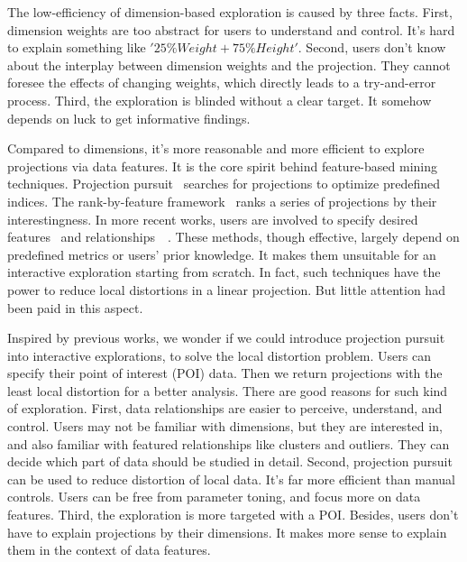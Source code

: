 The low-efficiency of dimension-based exploration is caused by three facts. First, dimension weights are too abstract for users to understand and control. It's hard to explain something like $'25\% Weight + 75\% Height'$. Second, users don't know about the interplay between dimension weights and the projection. They cannot foresee the effects of changing weights, which directly leads to a try-and-error process. Third, the exploration is blinded without a clear target. It somehow depends on luck to get informative findings.

Compared to dimensions, it's more reasonable and more efficient to explore projections via data features. It is the core spirit behind feature-based mining techniques. Projection pursuit~\cite{DBLP:journals/tc/FriedmanT74} searches for projections to optimize predefined indices. The rank-by-feature framework~\cite{DBLP:journals/ivs/SeoS05} ranks a series of projections by their interestingness. In more recent works, users are involved to specify desired features~\cite{DBLP:journals/tvcg/JohanssonJ09} and relationships~\cite{DBLP:journals/tvcg/HuBMHNL13}~\cite{DBLP:journals/tvcg/Gleicher13}. These methods, though effective, largely depend on predefined metrics or users' prior knowledge. It makes them unsuitable for an interactive exploration starting from scratch. In fact, such techniques have the power to reduce local distortions in a linear projection. But little attention had been paid in this aspect.

Inspired by previous works, we wonder if we could introduce projection pursuit into interactive explorations, to solve the local distortion problem. Users can specify their point of interest (POI) data. Then we return projections with the least local distortion for a better analysis. There are good reasons for such kind of exploration. First, data relationships are easier to perceive, understand, and control. Users may not be familiar with dimensions, but they are interested in, and also familiar with featured relationships like clusters and outliers. They can decide which part of data should be studied in detail. Second, projection pursuit can be used to reduce distortion of local data. It's far more efficient than manual controls. Users can be free from parameter toning, and focus more on data features. Third, the exploration is more targeted with a POI. Besides, users don't have to explain projections by their dimensions. It makes more sense to explain them in the context of data features.


